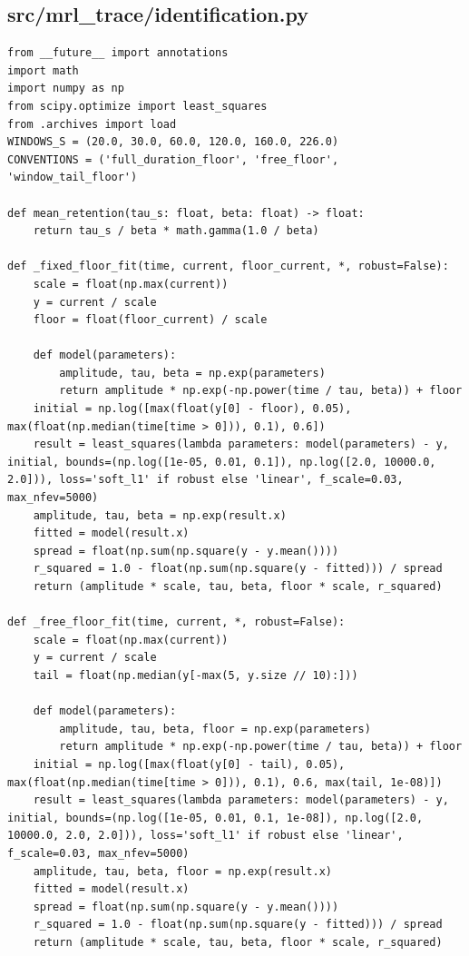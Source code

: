 \documentclass[a4paper,10pt]{article}
\begin{document}
\subsection{src/mrl\_trace/identification.py}
\begin{Verbatim}
from __future__ import annotations
import math
import numpy as np
from scipy.optimize import least_squares
from .archives import load
WINDOWS_S = (20.0, 30.0, 60.0, 120.0, 160.0, 226.0)
CONVENTIONS = ('full_duration_floor', 'free_floor', 'window_tail_floor')

def mean_retention(tau_s: float, beta: float) -> float:
    return tau_s / beta * math.gamma(1.0 / beta)

def _fixed_floor_fit(time, current, floor_current, *, robust=False):
    scale = float(np.max(current))
    y = current / scale
    floor = float(floor_current) / scale

    def model(parameters):
        amplitude, tau, beta = np.exp(parameters)
        return amplitude * np.exp(-np.power(time / tau, beta)) + floor
    initial = np.log([max(float(y[0] - floor), 0.05), max(float(np.median(time[time > 0])), 0.1), 0.6])
    result = least_squares(lambda parameters: model(parameters) - y, initial, bounds=(np.log([1e-05, 0.01, 0.1]), np.log([2.0, 10000.0, 2.0])), loss='soft_l1' if robust else 'linear', f_scale=0.03, max_nfev=5000)
    amplitude, tau, beta = np.exp(result.x)
    fitted = model(result.x)
    spread = float(np.sum(np.square(y - y.mean())))
    r_squared = 1.0 - float(np.sum(np.square(y - fitted))) / spread
    return (amplitude * scale, tau, beta, floor * scale, r_squared)

def _free_floor_fit(time, current, *, robust=False):
    scale = float(np.max(current))
    y = current / scale
    tail = float(np.median(y[-max(5, y.size // 10):]))

    def model(parameters):
        amplitude, tau, beta, floor = np.exp(parameters)
        return amplitude * np.exp(-np.power(time / tau, beta)) + floor
    initial = np.log([max(float(y[0] - tail), 0.05), max(float(np.median(time[time > 0])), 0.1), 0.6, max(tail, 1e-08)])
    result = least_squares(lambda parameters: model(parameters) - y, initial, bounds=(np.log([1e-05, 0.01, 0.1, 1e-08]), np.log([2.0, 10000.0, 2.0, 2.0])), loss='soft_l1' if robust else 'linear', f_scale=0.03, max_nfev=5000)
    amplitude, tau, beta, floor = np.exp(result.x)
    fitted = model(result.x)
    spread = float(np.sum(np.square(y - y.mean())))
    r_squared = 1.0 - float(np.sum(np.square(y - fitted))) / spread
    return (amplitude * scale, tau, beta, floor * scale, r_squared)


\end{Verbatim}
\end{document}

